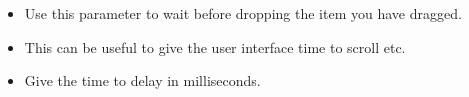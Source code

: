 \begin{itemize}
\item Use this parameter to wait before dropping the item you have dragged. 
\item This can be useful to give the user interface time to scroll etc. 
\item Give the time to delay in milliseconds. 
\end{itemize}
